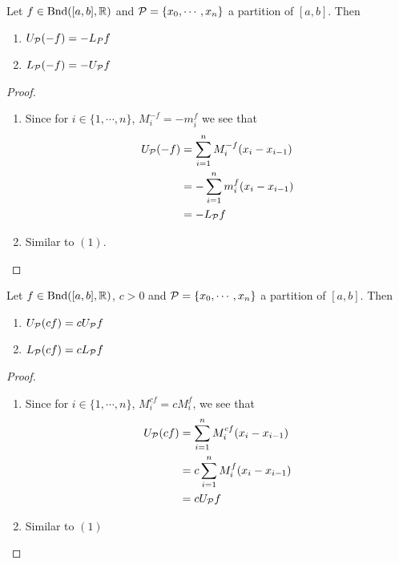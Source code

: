 \documentclass{book}
\begin{document}
	\begin{ex}  
		Let $f \in \text{Bnd}([a,b], \mathbb{R})$ and $\mathcal{P} = \{x_0, \cdots, x_n\}$ a partition of $[a,b]$. Then 
		\begin{enumerate}
			\item $U_{\mathcal{P}} (-f) = -L_P f$
			\item $L_{\mathcal{P}} (-f) = - U_{\mathcal{P}} f$
		\end{enumerate}
	\end{ex}
	
	\begin{proof}\
		\begin{enumerate}
			\item Since for $i \in \{1, \cdots, n\}$, $M^{-f}_i = -m^f_i$ we see that 
			\begin{align*}
				U_{\mathcal{P}}(-f) 
				&= \sum\limits_{i=1}^n M^{-f}_i(x_i - x_{i-1}) \\
				&= - \sum\limits_{i=1}^n m^f_i(x_i - x_{i-1}) \\
				&= - L_{\mathcal{P}} f
			\end{align*}
			\item Similar to $(1)$.
		\end{enumerate}
	\end{proof}
	
	\begin{ex}  
		Let $f \in \text{Bnd}([a,b], \mathbb{R})$, $c >0$ and $\mathcal{P} = \{x_0, \cdots, x_n\}$ a partition of $[a,b]$. Then 
		\begin{enumerate}
			\item $U_{\mathcal{P}} (cf) = c U_{\mathcal{P}} f$ 
			\item $L_{\mathcal{P}} (cf) = c L_{\mathcal{P}} f $
		\end{enumerate}
	\end{ex}
	
	\begin{proof}\
		\begin{enumerate}
			\item Since for $i \in \{1, \cdots, n\}$, $M^{cf}_i = cM^f_i$, we see that  
			\begin{align*}
				U_{\mathcal{P}} (cf) 
				&= \sum\limits_{i=1}^n M^{cf}_i (x_i - x_{i-1}) \\
				&= c \sum\limits_{i=1}^n M^f_i (x_i - x_{i-1}) \\
				&= c U_{\mathcal{P}} f
			\end{align*}
			\item Similar to $(1)$
		\end{enumerate}
	\end{proof}
	
\end{document}
